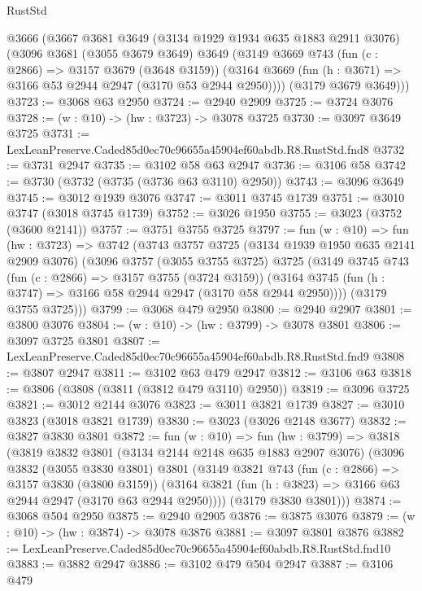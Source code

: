 \begin{lexlean}{RustStd}
\begin{coremodule}
  @3666
    (@3667
      @3681
      @3649
      (@3134 @1929 @1934 @635 @1883 @2911 @3076)
      (@3096
        @3681
        (@3055 @3679 @3649)
        @3649
        (@3149
          @3669
          @743
          (fun (c : @2866) => @3157 @3679 (@3648 @3159))
          (@3164 @3669 (fun (h : @3671) => @3166 @53 @2944 @2947 (@3170 @53 @2944 @2950))))
        (@3179 @3679 @3649)))
@3723 := @3068 @63 @2950
@3724 := @2940 @2909
@3725 := @3724 @3076
@3728 := (w : @10) -> (hw : @3723) -> @3078 @3725
@3730 := @3097 @3649 @3725
@3731 := LexLeanPreserve.Caded85d0ec70c96655a45904ef60abdb.R8.RustStd.fnd8
@3732 := @3731 @2947
@3735 := @3102 @58 @63 @2947
@3736 := @3106 @58
@3742 := @3730 (@3732 (@3735 (@3736 @63 @3110) @2950))
@3743 := @3096 @3649
@3745 := @3012 @1939 @3076
@3747 := @3011 @3745 @1739
@3751 := @3010 @3747 (@3018 @3745 @1739)
@3752 := @3026 @1950
@3755 := @3023 (@3752 (@3600 @2141))
@3757 := @3751 @3755 @3725
@3797 := fun (w : @10) =>
  fun (hw : @3723) =>
  @3742
    (@3743
      @3757
      @3725
      (@3134 @1939 @1950 @635 @2141 @2909 @3076)
      (@3096
        @3757
        (@3055 @3755 @3725)
        @3725
        (@3149
          @3745
          @743
          (fun (c : @2866) => @3157 @3755 (@3724 @3159))
          (@3164 @3745 (fun (h : @3747) => @3166 @58 @2944 @2947 (@3170 @58 @2944 @2950))))
        (@3179 @3755 @3725)))
@3799 := @3068 @479 @2950
@3800 := @2940 @2907
@3801 := @3800 @3076
@3804 := (w : @10) -> (hw : @3799) -> @3078 @3801
@3806 := @3097 @3725 @3801
@3807 := LexLeanPreserve.Caded85d0ec70c96655a45904ef60abdb.R8.RustStd.fnd9
@3808 := @3807 @2947
@3811 := @3102 @63 @479 @2947
@3812 := @3106 @63
@3818 := @3806 (@3808 (@3811 (@3812 @479 @3110) @2950))
@3819 := @3096 @3725
@3821 := @3012 @2144 @3076
@3823 := @3011 @3821 @1739
@3827 := @3010 @3823 (@3018 @3821 @1739)
@3830 := @3023 (@3026 @2148 @3677)
@3832 := @3827 @3830 @3801
@3872 := fun (w : @10) =>
  fun (hw : @3799) =>
  @3818
    (@3819
      @3832
      @3801
      (@3134 @2144 @2148 @635 @1883 @2907 @3076)
      (@3096
        @3832
        (@3055 @3830 @3801)
        @3801
        (@3149
          @3821
          @743
          (fun (c : @2866) => @3157 @3830 (@3800 @3159))
          (@3164 @3821 (fun (h : @3823) => @3166 @63 @2944 @2947 (@3170 @63 @2944 @2950))))
        (@3179 @3830 @3801)))
@3874 := @3068 @504 @2950
@3875 := @2940 @2905
@3876 := @3875 @3076
@3879 := (w : @10) -> (hw : @3874) -> @3078 @3876
@3881 := @3097 @3801 @3876
@3882 := LexLeanPreserve.Caded85d0ec70c96655a45904ef60abdb.R8.RustStd.fnd10
@3883 := @3882 @2947
@3886 := @3102 @479 @504 @2947
@3887 := @3106 @479

\end{coremodule}
\end{lexlean}
